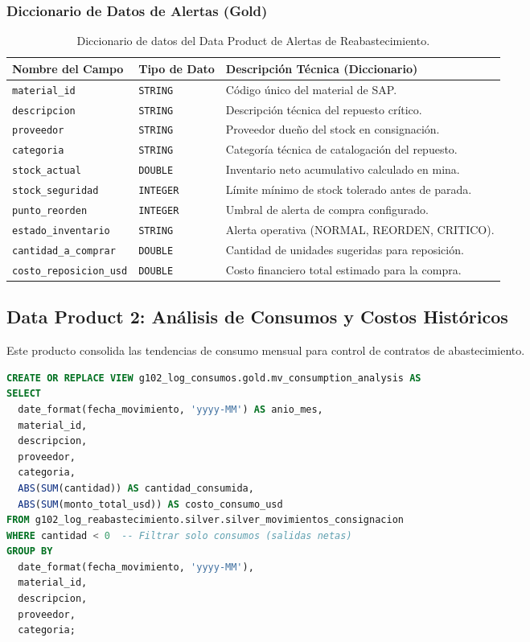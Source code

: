 \documentclass[11pt,a4paper]{article}
\begin{document}
\subsubsection{Diccionario de Datos de Alertas (Gold)}
\begin{table}[h]
    \centering
    \footnotesize
    \begin{tabular}{lll}
        \toprule
        \textbf{Nombre del Campo} & \textbf{Tipo de Dato} & \textbf{Descripción Técnica (Diccionario)} \\
        \midrule
        \texttt{material\_id} & \texttt{STRING} & Código único del material de SAP. \\
        \texttt{descripcion} & \texttt{STRING} & Descripción técnica del repuesto crítico. \\
        \texttt{proveedor} & \texttt{STRING} & Proveedor dueño del stock en consignación. \\
        \texttt{categoria} & \texttt{STRING} & Categoría técnica de catalogación del repuesto. \\
        \texttt{stock\_actual} & \texttt{DOUBLE} & Inventario neto acumulativo calculado en mina. \\
        \texttt{stock\_seguridad} & \texttt{INTEGER} & Límite mínimo de stock tolerado antes de parada. \\
        \texttt{punto\_reorden} & \texttt{INTEGER} & Umbral de alerta de compra configurado. \\
        \texttt{estado\_inventario} & \texttt{STRING} & Alerta operativa (NORMAL, REORDEN, CRITICO). \\
        \texttt{cantidad\_a\_comprar} & \texttt{DOUBLE} & Cantidad de unidades sugeridas para reposición. \\
        \texttt{costo\_reposicion\_usd} & \texttt{DOUBLE} & Costo financiero total estimado para la compra. \\
        \bottomrule
    \end{tabular}
    \caption{Diccionario de datos del Data Product de Alertas de Reabastecimiento.}
\end{table}

\subsection{Data Product 2: Análisis de Consumos y Costos Históricos}
Este producto consolida las tendencias de consumo mensual para control de contratos de abastecimiento.

\begin{lstlisting}[language=SQL, caption=DDL de Creación de Análisis de Consumos]
CREATE OR REPLACE VIEW g102_log_consumos.gold.mv_consumption_analysis AS
SELECT 
  date_format(fecha_movimiento, 'yyyy-MM') AS anio_mes, 
  material_id, 
  descripcion, 
  proveedor, 
  categoria,
  ABS(SUM(cantidad)) AS cantidad_consumida, 
  ABS(SUM(monto_total_usd)) AS costo_consumo_usd
FROM g102_log_reabastecimiento.silver.silver_movimientos_consignacion
WHERE cantidad < 0  -- Filtrar solo consumos (salidas netas)
GROUP BY 
  date_format(fecha_movimiento, 'yyyy-MM'), 
  material_id, 
  descripcion, 
  proveedor, 
  categoria;
\end{lstlisting}
\end{document}
